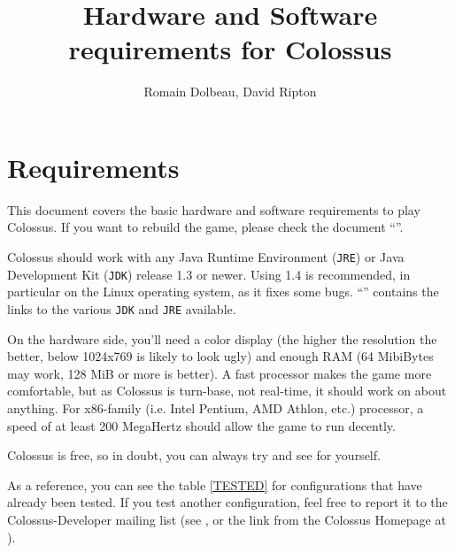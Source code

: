 \documentclass{article}
\begin{document}

\title{Hardware and Software requirements for Colossus}

\author{Romain Dolbeau, David Ripton}

\maketitle

\section{Requirements}

This document covers the basic hardware and software requirements to play Colossus. If you want to rebuild the game, please check the document ``''.

Colossus should work with any Java Runtime Environment (\texttt{JRE}) or Java Development Kit (\texttt{JDK}) release 1.3 or newer. Using 1.4 is recommended, in particular on the Linux operating system, as it fixes some bugs. ``'' contains the links to the various \texttt{JDK} and \texttt{JRE} available.

On the hardware side, you'll need a color display (the higher the resolution the better, below 1024x769 is likely to look ugly) and enough RAM (64 MibiBytes \cite{NIST-RCUU} may work, 128 MiB or more is better). A fast processor makes the game more comfortable, but as Colossus is turn-base, not real-time, it should work on about anything. For x86-family (i.e. Intel Pentium, AMD Athlon, etc.) processor, a speed of  at least 200 MegaHertz should allow the game to run decently.

Colossus is free, so in doubt, you can always try and see for yourself.

As a reference, you can see the table \ref{TESTED} for configurations that have already been tested. If you test another configuration, feel free to report it to the Colossus-Developer mailing list (see , or the link from the Colossus Homepage at ).
\end{document}
